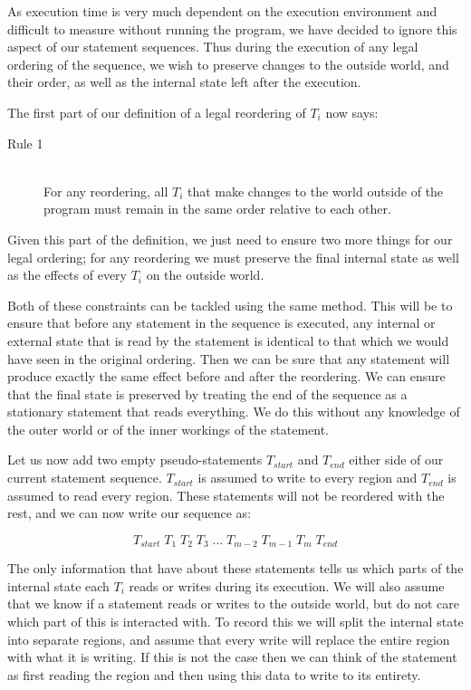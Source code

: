 \documentclass[twoside,a4paper]{report}
\begin{document}
As execution time is very much dependent on the execution environment and difficult to measure without running the program, we have decided to ignore this aspect
of our statement sequences. Thus during the execution of any legal ordering of the sequence, we wish to preserve changes to the outside world, and their order,
as well as the internal state left after the execution.

The first part of our definition of a legal reordering of $T_i$ now says:

\begin{description}
\item[Rule 1] \hfill \\
For any reordering, all $T_i$ that make changes to the world outside of the program must remain in the same order relative to each other.
\end{description}

Given this part of the definition, we just need to ensure two more things for our legal ordering; for any reordering we must preserve the final internal
state as well as the effects of every $T_i$ on the outside world.

Both of these constraints can be tackled using the same method. This will be to ensure that before any statement in the sequence is executed, any internal
or external state that is read by the statement is identical to that which we would have seen in the original ordering. Then we can be sure that any statement
will produce exactly the same effect before and after the reordering. We can ensure that the final state is preserved by treating the end of the sequence as
a stationary statement that reads everything. We do this without any knowledge of the outer world or of the inner workings of the statement.

Let us now add two empty pseudo-statements $T_{start}$ and $T_{end}$ either side of our current statement sequence. $T_{start}$ is assumed to write to every
region and $T_{end}$ is assumed to read every region. These statements will not be reordered with the rest, and we can now write our sequence as:

$$T_{start} \; T_1 \; T_2 \; T_3 \; \ldots \; T_{m-2} \; T_{m-1} \; T_m \; T_{end}$$

The only information that have about these statements tells us which parts of the internal state each $T_i$ reads or writes during its execution. We will
also assume that we know if a statement reads or writes to the outside world, but do not care which part of this is interacted with. To record this we
will split the internal state into separate regions, and assume that every write will replace the entire region with what it is writing. If this is not
the case then we can think of the statement as first reading the region and then using this data to write to its entirety.
\end{document}
